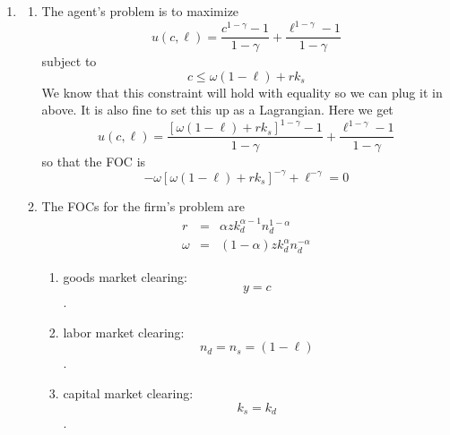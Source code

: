 \documentclass[12pt]{article}
\begin{document}
\begin{enumerate}
\item 
\begin{enumerate}
\item The agent's problem is to maximize%
\begin{equation*}
u\left( c,\ell \right) =\frac{c^{1-\gamma }-1}{1-\gamma }+\frac{\ell
^{1-\gamma }-1}{1-\gamma }
\end{equation*}%
subject to 
\begin{equation*}
c\leq \omega \left( 1-\ell \right) +rk_{s}
\end{equation*}%
We know that this constraint will hold with equality so we can plug it in
above. It is also fine to set this up as a Lagrangian. Here we get 
\begin{equation*}
u\left( c,\ell \right) =\frac{\left[ \omega \left( 1-\ell \right) +rk_{s}%
\right] ^{1-\gamma }-1}{1-\gamma }+\frac{\ell ^{1-\gamma }-1}{1-\gamma }
\end{equation*}%
so that the FOC is 
\begin{equation}
-\omega \left[ \omega \left( 1-\ell \right) +rk_{s}\right] ^{-\gamma }+\ell
^{-\gamma }=0  \label{ut}
\end{equation}

\item The FOCs for the firm's problem are 
\begin{eqnarray}
r &=&\alpha zk_{d}^{\alpha -1}n_{d}^{1-\alpha }  \label{r} \\
\omega &=&\left( 1-\alpha \right) zk_{d}^{\alpha }n_{d}^{-\alpha }
\label{w2}
\end{eqnarray}

\begin{enumerate}
\item goods market clearing: 
\begin{equation}
y=c  \label{m1}
\end{equation}%
$.$

\item labor market clearing: 
\begin{equation}
n_{d}=n_{s}=\left( 1-\ell \right)  \label{m2}
\end{equation}%
$.$

\item capital market clearing:%
\begin{equation}
k_{s}=k_{d}  \label{m3}
\end{equation}%
$.$
\end{enumerate}


\end{enumerate}
\end{enumerate}
\end{document}
